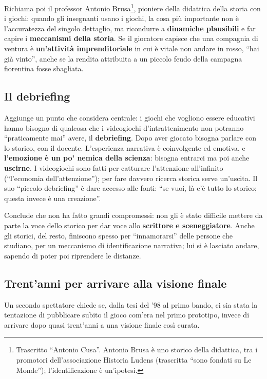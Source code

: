 Richiama poi il professor Antonio Brusa\footnote{Trascritto ``Antonio Cusa''.
Antonio Brusa è uno storico della didattica, tra i promotori dell'associazione
Historia Ludens (trascritta ``sono fondati su Le Monde''); l'identificazione è
un'ipotesi.}, pioniere della didattica della storia con i giochi: quando gli
insegnanti usano i giochi, la cosa più importante non è l'accuratezza del
singolo dettaglio, ma ricondurre a \textbf{dinamiche plausibili} e far capire i
\textbf{meccanismi della storia}. Se il giocatore capisce che una compagnia di
ventura è \textbf{un'attività imprenditoriale} in cui è vitale non andare in
rosso, ``hai già vinto'', anche se la rendita attribuita a un piccolo feudo
della campagna fiorentina fosse sbagliata.

\subsection{Il debriefing}

Aggiunge un punto che considera centrale: i giochi che vogliono essere educativi
hanno bisogno di qualcosa che i videogiochi d'intrattenimento non potranno
``praticamente mai'' avere, il \textbf{debriefing}. Dopo aver giocato bisogna
parlare con lo storico, con il docente. L'esperienza narrativa è coinvolgente
ed emotiva, e \textbf{l'emozione è un po' nemica della scienza}: bisogna entrarci
ma poi anche \textbf{uscirne}. I videogiochi sono fatti per catturare
l'attenzione all'infinito (``l'economia dell'attenzione''); per fare davvero
ricerca storica serve un'uscita. Il suo ``piccolo debriefing'' è dare accesso
alle fonti: ``se vuoi, là c'è tutto lo storico; questa invece è una
creazione''.

Conclude che non ha fatto grandi compromessi: non gli è stato difficile mettere
da parte la voce dello storico per dar voce allo \textbf{scrittore e
sceneggiatore}. Anche gli storici, del resto, finiscono spesso per
``innamorarsi'' delle persone che studiano, per un meccanismo di
identificazione narrativa; lui si è lasciato andare, sapendo di poter poi
riprendere le distanze.

\subsection{Trent'anni per arrivare alla visione finale}

Un secondo spettatore chiede se, dalla tesi del '98 al primo bando, ci sia stata
la tentazione di pubblicare subito il gioco com'era nel primo prototipo, invece
di arrivare dopo quasi trent'anni a una visione finale così curata.


